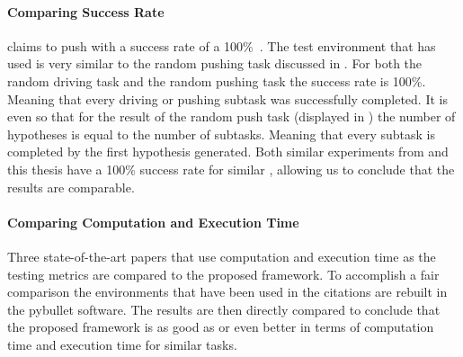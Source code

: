 \begin{table}[H]
\begin{tabular}
  \end{tabular}
  \caption{Overview of recent state-of-the-art papers that include a subset of the 3 topics (learning system models, \ac{NAMO}, and nonprehensile pushing). The \textit{grasp-push} and \textit{grasp-pull} refer to prehensile push and pull manipulation, \textit{gripped} refers to fully gripping and lifting objects for manipulation, \textit{pushing} refers to nonprehensile push manipulation. The test metric indicates the testing method used by the paper, where the underlined metric is used to compare against the proposed framework.}%
\label{table:sota_vs_results_proposed method}
\end{table}

\paragraph{Comparing Success Rate}
\citeauthor{ellis_navigation_2022} claims to push with a success rate of a 100\%~\cite{ellis_navigation_2022}. The test environment that \citeauthor{ellis_navigation_2022} has used is very similar to the random pushing task discussed in . For both the random driving task and the random pushing task the success rate is 100\%. Meaning that every driving or pushing subtask was successfully completed. It is even so that for the result of the random push task (displayed in ) the number of hypotheses is equal to the number of subtasks. Meaning that every subtask is completed by the first hypothesis generated. Both similar experiments from \citeauthor{ellis_navigation_2022} and this thesis have a 100\% success rate for similar 
, allowing us to conclude that the results are comparable.

\paragraph{Comparing Computation and Execution Time}
Three state-of-the-art papers that use computation and execution time as the testing metrics are compared to the proposed framework. To accomplish a fair comparison the environments that have been used in the citations are rebuilt in the pybullet software. The results are then directly compared to conclude that the proposed framework is as good as or even better in terms of computation time and execution time for similar tasks.\bs

